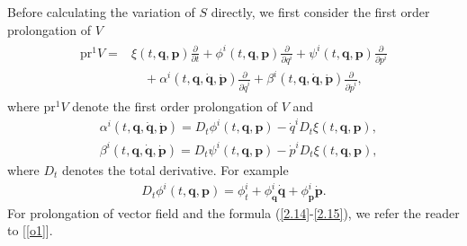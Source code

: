 \documentclass[a4paper,a4paper]{article}
\def\q{\boldsymbol{q}}
\def\p{\boldsymbol{p}}
\begin{document}
Before calculating the variation of $S$ directly, we first consider the first order
prolongation of $V$
\begin{align}
\begin{split}
 \text{pr}^{1}V=&\xi(t, \q, \p)\frac{\partial}{\partial t}+
      \phi^{i}(t, \q, \p)\frac{\partial}{\partial q^{i}}
      + \psi^{i}(t, \q, \p)\frac{\partial}{\partial p^{i}} \\
      &\quad +\alpha^{i}(t, \q, \dot{\q}, \dot{\p})\frac{\partial}
      {\partial \dot{q}^{i}}
      +\beta^{i}(t, \q, \dot{\q}, \dot{\p})\frac{\partial}{\partial \dot{p}^{i}},
\end{split}\label{2.13}
\end{align}
where $\text{pr}^{1}V$ denote the first order prolongation
of $V$ and
\begin{align}
      &\alpha^{i}(t, \q, \dot{\q}, \dot{\p})=
       D_{t}\phi^{i}(t, \q, \p)-\dot{q}^{i}D_{t}\xi(t, \q, \p), \label{2.14}\\
      &\beta^{i}(t, \q, \dot{\q}, \dot{\p})=
       D_{t}\psi^{i}(t, \q, \p)-\dot{p}^{i}D_{t}\xi(t, \q, \p), \label{2.15}
\end{align}
where $D_{t}$ denotes the total derivative. For example
\begin{align*}
  D_{t}\phi^{i}(t, \q, \p)=\phi^{i}_{t}+\phi^{i}_{\q}\dot{\q}+\phi^{i}_{\p}\dot{\p}.
\end{align*}
For prolongation of vector field and the formula (\ref{2.14}-\ref{2.15}), we refer
the reader to [\ref{o1}].
\end{document}
